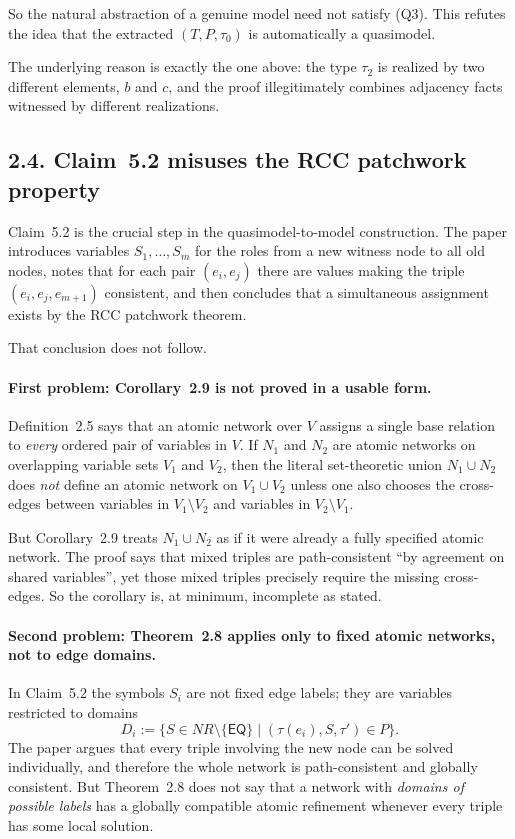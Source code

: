 \documentclass[11pt]{article}
\newcommand{\role}[1]{\ensuremath{\mathsf{#1}}}
\newcommand{\EQ}{\role{EQ}}
\begin{document}
So the natural abstraction of a genuine model need not satisfy (Q3). This refutes the idea that the extracted $(T,P,\tau_0)$ is automatically a quasimodel.

The underlying reason is exactly the one above: the type $\tau_2$ is realized by two different elements, $b$ and $c$, and the proof illegitimately combines adjacency facts witnessed by different realizations.

\subsection*{2.4. Claim~5.2 misuses the RCC patchwork property}

Claim~5.2 is the crucial step in the quasimodel-to-model construction. The paper introduces variables $S_1,\dots,S_m$ for the roles from a new witness node to all old nodes, notes that for each pair $(e_i,e_j)$ there are values making the triple $(e_i,e_j,e_{m+1})$ consistent, and then concludes that a simultaneous assignment exists by the RCC patchwork theorem.

That conclusion does not follow.

\paragraph{First problem: Corollary~2.9 is not proved in a usable form.}
Definition~2.5 says that an atomic network over $V$ assigns a single base relation to \emph{every} ordered pair of variables in $V$. If $N_1$ and $N_2$ are atomic networks on overlapping variable sets $V_1$ and $V_2$, then the literal set-theoretic union $N_1 \cup N_2$ does \emph{not} define an atomic network on $V_1 \cup V_2$ unless one also chooses the cross-edges between variables in $V_1 \setminus V_2$ and variables in $V_2 \setminus V_1$.

But Corollary~2.9 treats $N_1 \cup N_2$ as if it were already a fully specified atomic network. The proof says that mixed triples are path-consistent ``by agreement on shared variables'', yet those mixed triples precisely require the missing cross-edges. So the corollary is, at minimum, incomplete as stated.

\paragraph{Second problem: Theorem~2.8 applies only to fixed atomic networks, not to edge domains.}
In Claim~5.2 the symbols $S_i$ are not fixed edge labels; they are variables restricted to domains
\[
D_i := \{S \in NR \setminus \{\EQ\} \mid (\tau(e_i),S,\tau') \in P\}.
\]
The paper argues that every triple involving the new node can be solved individually, and therefore the whole network is path-consistent and globally consistent. But Theorem~2.8 does not say that a network with \emph{domains of possible labels} has a globally compatible atomic refinement whenever every triple has some local solution.
\end{document}
